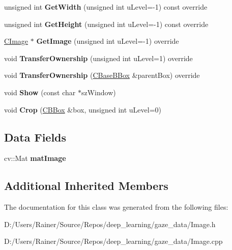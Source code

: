 \begin{DoxyCompactItemize}
\item 
\mbox{\label{class_c_image_a9a3cb583ae8f174275d23f4e815fb995}} 
unsigned int {\bfseries Get\+Width} (unsigned int u\+Level=-\/1) const override
\item 
\mbox{\label{class_c_image_a473d570aeb9e1b144cd14b2d811c546e}} 
unsigned int {\bfseries Get\+Height} (unsigned int u\+Level=-\/1) const override
\item 
\mbox{\label{class_c_image_ad6973a532fcbc6f409406b17c4e850da}} 
\hyperlink{class_c_image}{C\+Image} $\ast$ {\bfseries Get\+Image} (unsigned int u\+Level=-\/1) override
\item 
\mbox{\label{class_c_image_a85ee33c3ecfc97f82bbf7034079d785f}} 
void {\bfseries Transfer\+Ownership} (unsigned int u\+Level=1) override
\item 
\mbox{\label{class_c_image_a1add3042a22efb5e828fe786fd98f1de}} 
void {\bfseries Transfer\+Ownership} (\hyperlink{class_c_base_b_box}{C\+Base\+B\+Box} \&parent\+Box) override
\item 
\mbox{\label{class_c_image_a924b9367ed2850ab65ef9e21c09f6366}} 
void {\bfseries Show} (const char $\ast$sz\+Window)
\item 
\mbox{\label{class_c_image_a47709f5aa2f3d830b6077aec02c5af3a}} 
void {\bfseries Crop} (\hyperlink{class_c_b_box}{C\+B\+Box} \&box, unsigned int u\+Level=0)
\end{DoxyCompactItemize}
\subsection*{Data Fields}
\begin{DoxyCompactItemize}
\item 
\mbox{\label{class_c_image_a58684a2b3cfafec2e433018166a21f28}} 
cv\+::\+Mat {\bfseries mat\+Image}
\end{DoxyCompactItemize}
\subsection*{Additional Inherited Members}


The documentation for this class was generated from the following files\+:\begin{DoxyCompactItemize}
\item 
D\+:/\+Users/\+Rainer/\+Source/\+Repos/deep\+\_\+learning/gaze\+\_\+data/Image.\+h\item 
D\+:/\+Users/\+Rainer/\+Source/\+Repos/deep\+\_\+learning/gaze\+\_\+data/Image.\+cpp\end{DoxyCompactItemize}
